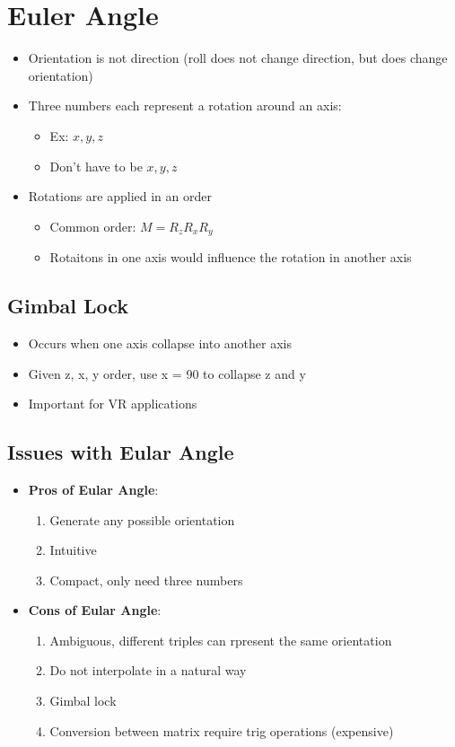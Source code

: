 \chapter{Euler Angle}

\begin{itemize}
  \item Orientation is not direction (roll does not change direction, but
  does change orientation)
  \item Three numbers each represent a rotation around an axis:
  \begin{itemize}
    \item Ex: $ x, y, z $
    \item Don’t have to be $ x, y, z $
  \end{itemize}

  \item Rotations are applied in an order
  \begin{itemize}
    \item Common order: $ M = R_{z} R_{x} R_{y} $
    \item Rotaitons in one axis would influence the rotation in another axis
  \end{itemize}
\end{itemize}

\section{Gimbal Lock}

  \begin{itemize}
    \item Occurs when one axis collapse into another axis
    \item Given z, x, y order, use x = 90 to collapse z and y
    \item Important for VR applications
  \end{itemize}

\section{Issues with Eular Angle}

  \begin{itemize}
    \item \textbf{Pros of Eular Angle}:
    \begin{enumerate}
      \item Generate any possible orientation
      \item Intuitive
      \item Compact, only need three numbers
    \end{enumerate}

    \item \textbf{Cons of Eular Angle}:
    \begin{enumerate}
      \item Ambiguous, different triples can rpresent the same orientation
      \item Do not interpolate in a natural way
      \item Gimbal lock
      \item Conversion between matrix require trig operations (expensive)
    \end{enumerate}
  \end{itemize}
